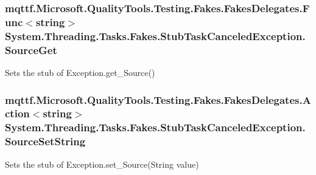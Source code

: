 \hypertarget{class_system_1_1_threading_1_1_tasks_1_1_fakes_1_1_stub_task_canceled_exception_a982ebc4dccee57a21cbb9446c9a85918}{
\subsubsection[{Source\-Get}]{\setlength{\rightskip}{0pt plus 5cm}mqttf.\-Microsoft.\-Quality\-Tools.\-Testing.\-Fakes.\-Fakes\-Delegates.\-Func$<$string$>$ System.\-Threading.\-Tasks.\-Fakes.\-Stub\-Task\-Canceled\-Exception.\-Source\-Get}}\label{class_system_1_1_threading_1_1_tasks_1_1_fakes_1_1_stub_task_canceled_exception_a982ebc4dccee57a21cbb9446c9a85918}


Sets the stub of Exception.\-get\-\_\-\-Source()

\hypertarget{class_system_1_1_threading_1_1_tasks_1_1_fakes_1_1_stub_task_canceled_exception_ad7796d215bea9904e2274b69e215a33e}{
\subsubsection[{Source\-Set\-String}]{\setlength{\rightskip}{0pt plus 5cm}mqttf.\-Microsoft.\-Quality\-Tools.\-Testing.\-Fakes.\-Fakes\-Delegates.\-Action$<$string$>$ System.\-Threading.\-Tasks.\-Fakes.\-Stub\-Task\-Canceled\-Exception.\-Source\-Set\-String}}\label{class_system_1_1_threading_1_1_tasks_1_1_fakes_1_1_stub_task_canceled_exception_ad7796d215bea9904e2274b69e215a33e}


Sets the stub of Exception.\-set\-\_\-\-Source(\-String value)

